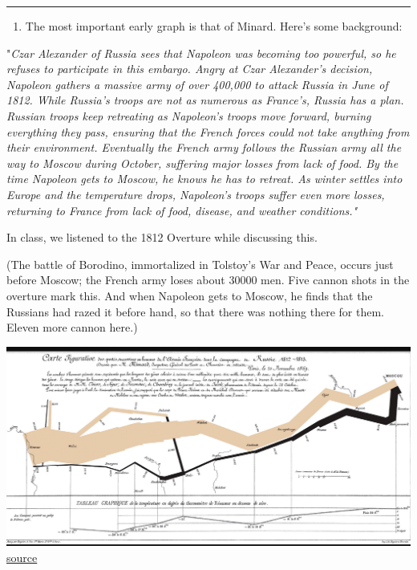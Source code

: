\documentclass[openany]{book}
\providecommand{\tightlist}{%
  \setlength{\itemsep}{0pt}\setlength{\parskip}{0pt}}
\begin{document}
\begin{center}\rule{0.5\linewidth}{\linethickness}\end{center}

\begin{enumerate}
\def\labelenumi{\arabic{enumi})}
\setcounter{enumi}{1}
\tightlist
\item
  The most important early graph is that of Minard. Here's some background:
\end{enumerate}

"\emph{Czar Alexander of Russia sees that Napoleon was becoming too powerful, so he refuses to participate in this embargo. Angry at Czar Alexander's decision, Napoleon gathers a massive army of over 400,000 to attack Russia in June of 1812. While Russia's troops are not as numerous as France's, Russia has a plan. Russian troops keep retreating as Napoleon's troops move forward, burning everything they pass, ensuring that the French forces could not take anything from their environment. Eventually the French army follows the Russian army all the way to Moscow during October, suffering major losses from lack of food. By the time Napoleon gets to Moscow, he knows he has to retreat. As winter settles into Europe and the temperature drops, Napoleon's troops suffer even more losses, returning to France from lack of food, disease, and weather conditions."}

In class, we listened to the 1812 Overture while discussing this.

(The battle of Borodino, immortalized in Tolstoy's War and Peace, occurs just before Moscow; the French army loses about 30000 men. Five cannon shots in the overture mark this. And when Napoleon gets to Moscow, he finds that the Russians had razed it before hand, so that there was nothing there for them. Eleven more cannon here.)

\includegraphics{minard1812.PNG}\href{https://datavizblog.com/2013/05/30/dataviz-history-charles-minards-flow-map-of-napoleons-russian-campaign-of-1812-polotsk-smolensk-and-on-to-borodino/}{source}
\end{document}
